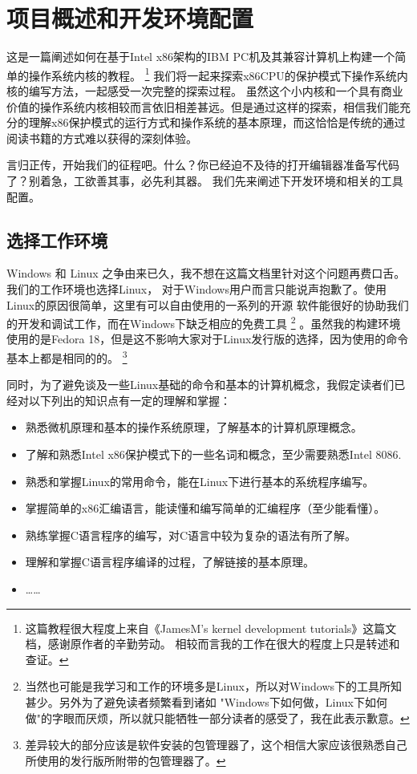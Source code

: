 
\section{项目概述和开发环境配置}

\par 这是一篇阐述如何在基于Intel x86架构的IBM PC机及其兼容计算机上构建一个简单的操作系统内核的教程。\allowbreak
\footnote{这篇教程很大程度上来自《JamesM's kernel development tutorials》这篇文档，感谢原作者的辛勤劳动。\allowbreak
相较而言我的工作在很大的程度上只是转述和查证。}
我们将一起来探索x86CPU的保护模式下操作系统内核的编写方法，一起感受一次完整的探索过程。\allowbreak
虽然这个小内核和一个具有商业价值的操作系统内核相较而言依旧相差甚远。但是通过这样的探索，相信我们能充\allowbreak
分的理解x86保护模式的运行方式和操作系统的基本原理，而这恰恰是传统的通过阅读书籍的方式难以获得的深刻体验。

\par 言归正传，开始我们的征程吧。什么？你已经迫不及待的打开编辑器准备写代码了？别着急，工欲善其事，必先利其器。\allowbreak
我们先来阐述下开发环境和相关的工具配置。

\subsection{选择工作环境}
\par Windows 和 Linux 之争由来已久，我不想在这篇文档里针对这个问题再费口舌。我们的工作环境也选择Linux，\allowbreak
对于Windows用户而言只能说声抱歉了。使用Linux的原因很简单，这里有可以自由使用的一系列的开源\allowbreak
软件能很好的协助我们的开发和调试工作，而在Windows下缺乏相应的免费工具\allowbreak
\footnote {当然也可能是我学习和工作的环境多是Linux，所以对Windows下的工具所知甚少。另外为了避免读者频繁看到诸如\allowbreak
"Windows下如何做，Linux下如何做"的字眼而厌烦，所以就只能牺牲一部分读者的感受了，我在此表示歉意。}
。虽然我的构建环境使用的是Fedora 18，但是这不影响大家对于Linux发行版的选择，因为使用的命令基本上都是相同的的。\allowbreak
\footnote {差异较大的部分应该是软件安装的包管理器了，这个相信大家应该很熟悉自己所使用的发行版所附带的包管理器了。}

\par 同时，为了避免谈及一些Linux基础的命令和基本的计算机概念，我假定读者们已经对以下列出的知识点有一定的理解和掌握：
\begin{itemize}
	\item 熟悉微机原理和基本的操作系统原理，了解基本的计算机原理概念。
	\item 了解和熟悉Intel x86保护模式下的一些名词和概念，至少需要熟悉Intel 8086.
	\item 熟悉和掌握Linux的常用命令，能在Linux下进行基本的系统程序编写。
	\item 掌握简单的x86汇编语言，能读懂和编写简单的汇编程序（至少能看懂）。
	\item 熟练掌握C语言程序的编写，对C语言中较为复杂的语法有所了解。
	\item 理解和掌握C语言程序编译的过程，了解链接的基本原理。
	\item ……
\end{itemize}

